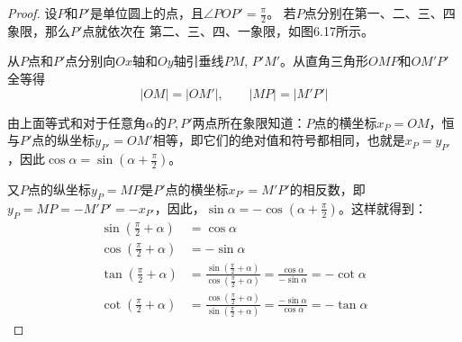 \begin{proof}
    设$P$和$P'$是单位圆上的点，且$\angle POP'=\frac{\pi}{2}$。
    若$P$点分别在第一、二、三、四象限，那么$P'$点就依次在
    第二、三、四、一象限，如图6.17所示。
\begin{figure}[htp]
    \centering
{}
    \caption{}
\end{figure}

    从$P$点和$P'$点分别向$Ox$轴和$Oy$轴引垂线$PM$, $P'M'$。从直角三角形$OMP$和$OM'P'$全等得
\[|OM|=|OM'|,\qquad |MP|=|M'P'|\]
    
由上面等式和对于任意角$\alpha$的$P,P'$两点所在象限知道：$P$点的横坐标$x_P=OM$，恒与$P'$点的纵坐标$y_{P'}=OM'$相等，即它们的绝对值和符号都相同，也就是$x_P=y_{P'}$，因此$\cos\alpha=\sin\left(\alpha+\frac{\pi}{2}\right)$。

又$P$点的纵坐标$y_P=MP$是$P'$点的横坐标$x_{P'}=M'P'$的相反数，即$y_P=MP=-M'P'=-x_{P'}$，因此，$\sin\alpha=-\cos\left(\alpha+\frac{\pi}{2}\right)$。这样就得到：
\[\begin{split}
    \sin\left(\frac{\pi}{2}+\alpha\right)&=\cos\alpha\\
    \cos\left(\frac{\pi}{2}+\alpha\right)&=-\sin\alpha\\
    \tan\left(\frac{\pi}{2}+\alpha\right)&=\frac{\sin\left(\frac{\pi}{2}+\alpha\right)}{\cos\left(\frac{\pi}{2}+\alpha\right)}=\frac{\cos\alpha}{-\sin\alpha}=-\cot\alpha\\
    \cot\left(\frac{\pi}{2}+\alpha\right)&=\frac{\cos\left(\frac{\pi}{2}+\alpha\right)}{\sin \left(\frac{\pi}{2}+\alpha\right)}=\frac{-\sin\alpha}{\cos\alpha}=-\tan\alpha
\end{split}\]
\end{proof}

